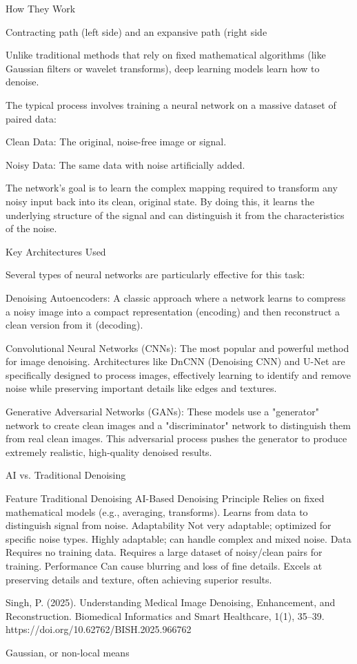 How They Work

Contracting
path (left side) and an expansive path (right side

Unlike traditional methods that rely on fixed mathematical algorithms (like Gaussian filters or wavelet transforms), deep learning models learn how to denoise.

The typical process involves training a neural network on a massive dataset of paired data:

    Clean Data: The original, noise-free image or signal.

    Noisy Data: The same data with noise artificially added.

    The network's goal is to learn the complex mapping required to transform any noisy input back into its clean, original state. By doing this, it learns the underlying structure of the signal and can distinguish it from the characteristics of the noise.

Key Architectures Used

Several types of neural networks are particularly effective for this task:

    Denoising Autoencoders: A classic approach where a network learns to compress a noisy image into a compact representation (encoding) and then reconstruct a clean version from it (decoding).

Convolutional Neural Networks (CNNs): The most popular and powerful method for image denoising. Architectures like DnCNN (Denoising CNN) and U-Net are specifically designed to process images, effectively learning to identify and remove noise while preserving important details like edges and textures.

Generative Adversarial Networks (GANs): These models use a "generator" network to create clean images and a "discriminator" network to distinguish them from real clean images. This adversarial process pushes the generator to produce extremely realistic, high-quality denoised results.

AI vs. Traditional Denoising

Feature	Traditional Denoising	AI-Based Denoising
Principle	Relies on fixed mathematical models (e.g., averaging, transforms).	Learns from data to distinguish signal from noise.
Adaptability	Not very adaptable; optimized for specific noise types.	Highly adaptable; can handle complex and mixed noise.
Data	Requires no training data.	Requires a large dataset of noisy/clean pairs for training.
Performance	Can cause blurring and loss of fine details.	Excels at preserving details and texture, often achieving superior results.

Singh, P. (2025). Understanding Medical Image Denoising, Enhancement, and Reconstruction. Biomedical Informatics and Smart Healthcare, 1(1), 35–39. https://doi.org/10.62762/BISH.2025.966762

Gaussian,  or non-local means